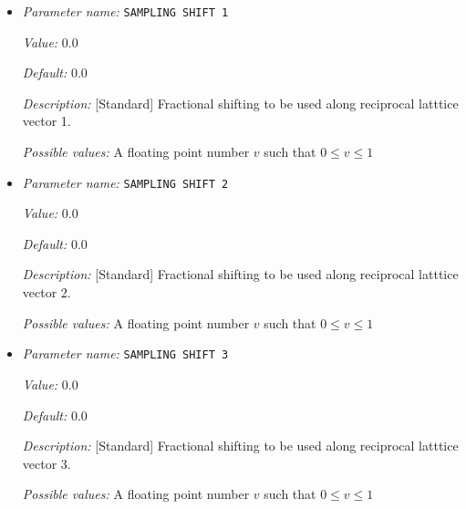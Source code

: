 \begin{itemize}
{\it Possible values:} An integer $n$ such that $1\leq n \leq 100$
\item {\it Parameter name:} {\tt SAMPLING SHIFT 1}
\label{parameters:Brillouin zone k point sampling options/Monkhorst_2dPack _28MP_29 grid generation/SAMPLING SHIFT 1}
\label{parameters:Brillouin_20zone_20k_20point_20sampling_20options/Monkhorst_2dPack_20_28MP_29_20grid_20generation/SAMPLING_20SHIFT_201}


{\it Value:} 0.0


{\it Default:} 0.0


{\it Description:} [Standard] Fractional shifting to be used along reciprocal latttice vector 1.


{\it Possible values:} A floating point number $v$ such that $0 \leq v \leq 1$
\item {\it Parameter name:} {\tt SAMPLING SHIFT 2}
\label{parameters:Brillouin zone k point sampling options/Monkhorst_2dPack _28MP_29 grid generation/SAMPLING SHIFT 2}
\label{parameters:Brillouin_20zone_20k_20point_20sampling_20options/Monkhorst_2dPack_20_28MP_29_20grid_20generation/SAMPLING_20SHIFT_202}


{\it Value:} 0.0


{\it Default:} 0.0


{\it Description:} [Standard] Fractional shifting to be used along reciprocal latttice vector 2.


{\it Possible values:} A floating point number $v$ such that $0 \leq v \leq 1$
\item {\it Parameter name:} {\tt SAMPLING SHIFT 3}
\label{parameters:Brillouin zone k point sampling options/Monkhorst_2dPack _28MP_29 grid generation/SAMPLING SHIFT 3}
\label{parameters:Brillouin_20zone_20k_20point_20sampling_20options/Monkhorst_2dPack_20_28MP_29_20grid_20generation/SAMPLING_20SHIFT_203}


{\it Value:} 0.0


{\it Default:} 0.0


{\it Description:} [Standard] Fractional shifting to be used along reciprocal latttice vector 3.


{\it Possible values:} A floating point number $v$ such that $0 \leq v \leq 1$
\end{itemize}

